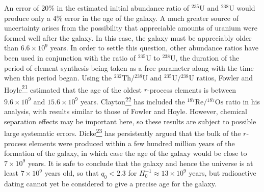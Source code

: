 An error of 20\% in the estimated initial abundance ratio of
\({}^{235}\mathrm U\) and \({}^{238}\mathrm U\) would produce only a 4\%
error in the age of the galaxy. A much greater source of uncertainty arises
from the possibility that appreciable amounts of uranium were formed well
after the galaxy. In this case, the galaxy must be appreciably older than
\(6.6\times10^9\) years. In order to settle this question, other abundance
ratios have been used in conjunction with the ratio of
\({}^{235}\mathrm U\) to \({}^{238}\mathrm U\), the duration of the period
of element synthesis being taken as a free parameter along with the time when
this period began. Using the \({}^{232}\mathrm{Th}/{}^{238}\mathrm U\) and
\({}^{235}\mathrm U/{}^{238}\mathrm U\) ratios, Fowler and
Hoyle\hyperref[ch15-ref-21]{\textsuperscript{21}} estimated that the age of
the oldest \(r\)-process elements is between \(9.6\times10^9\) and
\(15.6\times10^9\) years.
Clayton\hyperref[ch15-ref-22]{\textsuperscript{22}} has included the
\({}^{187}\mathrm{Re}/{}^{187}\mathrm{Os}\) ratio in his analysis, with
results similar to those of Fowler and Hoyle. However, chemical separation
effects may be important here, so these results are subject to possible large
systematic errors. Dicke\hyperref[ch15-ref-23]{\textsuperscript{23}} has
persistently argued that the bulk of the \(r\)-process elements were produced
within a few hundred million years of the formation of the galaxy, in which
case the age of the galaxy would be close to \(7\times10^9\) years. It is
safe to conclude that the galaxy and hence the universe is at least
\(7\times10^9\) years old, so that \(q_0<2.3\) for
\(H_0^{-1}\approx13\times10^9\) years, but radioactive dating cannot yet
be considered to give a precise age for the galaxy.

